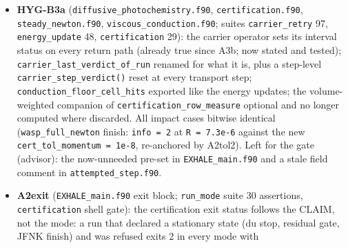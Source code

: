 \documentclass[english,a4paper]{my_memo}
\begin{document}
\begin{itemize}
  rule of \texttt{calc\_column\_dens} on the cell\textquotesingle s own opacity, with the cell\textquotesingle s own
  depth and its star-ward face as outputs. The beam transmission is
  \texttt{erfc(c\ sqrt(tau))}, not exponential, so its cell mean is a 3-point Gauss
  rule in \texttt{u\ =\ sqrt(tau)} (mean and mean of the square, since the trapping
  makes the field quadratic in the transmission); the photosphere factor\textquotesingle s
  mean is closed form with \texttt{log1p}. \texttt{jlya\_escape\_prob} keeps the cell center
  by Neufeld 1990 section II (the escape fraction is a point property of
  where the photon is created). Impact: \texttt{hydrostatic\_column},
  \texttt{mol\_base\_handoff} byte-identical; \texttt{wasp\_full} reaches its du stop at
  step 14442 on both binaries, wind unmoved (1e-7), the field 1.6e-3 and
  the Balmer proton source 6.5e-4; the face rule over-counted the column\textquotesingle s
  scatterings by 2.4 to 2.7 percent. Carried forward: the FUV band B2 line
  transmission in \texttt{util\_ion\_eq.f90} still reads a face value (B4-6c).
\item
  \textbf{HYG-B3a} (\texttt{diffusive\_photochemistry.f90}, \texttt{certification.f90},
  \texttt{steady\_newton.f90}, \texttt{viscous\_conduction.f90}; suites \texttt{carrier\_retry} 97,
  \texttt{energy\_update} 48, \texttt{certification} 29): the carrier operator sets its
  interval status on every return path (already true since A3b; now stated
  and tested); \texttt{carrier\_last\_verdict\_of\_run} renamed for what it is, plus a
  step-level \texttt{carrier\_step\_verdict()} reset at every transport step;
  \texttt{conduction\_floor\_cell\_hits} exported like the energy update\textquotesingle s; the
  volume-weighted companion of \texttt{certification\_row\_measure} optional and no
  longer computed where discarded. All impact cases bitwise identical
  (\texttt{wasp\_full\_newton} finish: \texttt{info\ =\ 2} at \texttt{\textbar{}\textbar{}R\textbar{}\textbar{}\ =\ 7.3e-6} against the
  new \texttt{cert\_tol\_momentum\ =\ 1e-8}, re-anchored by A2tol2). Left for the gate
  (advisor): the now-unneeded pre-set in \texttt{EXHALE\_main.f90} and a stale
  field comment in \texttt{attempted\_step.f90}.
\item
  \textbf{A2exit} (\texttt{EXHALE\_main.f90} exit block; \texttt{run\_mode} suite 30 assertions,
  \texttt{certification} shell gate): the certification exit status follows the
  CLAIM, not the mode: a run that declared a stationary state (du stop,
  residual gate, JFNK finish) and was refused exits 2 in every mode with

\end{itemize}
\end{document}

